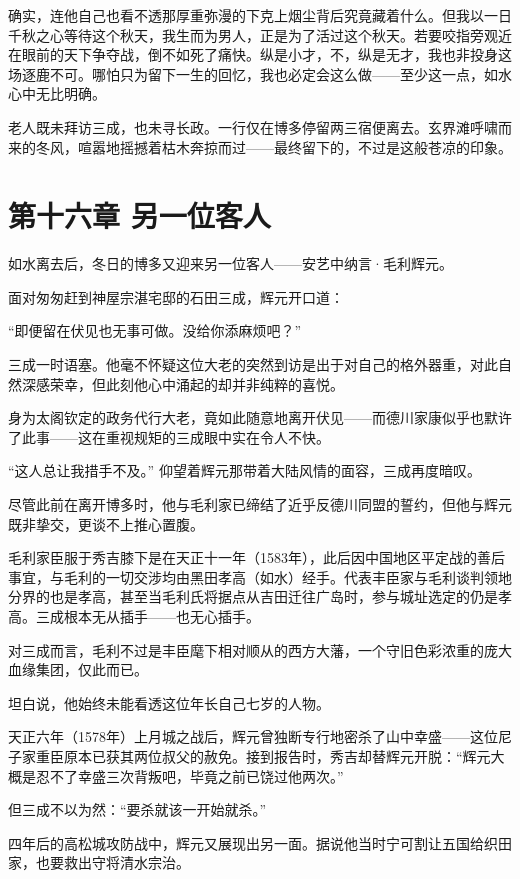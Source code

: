 \documentclass[
]{article}
\begin{document}
确实，连他自己也看不透那厚重弥漫的下克上烟尘背后究竟藏着什么。但我以一日千秋之心等待这个秋天，我生而为男人，正是为了活过这个秋天。若要咬指旁观近在眼前的天下争夺战，倒不如死了痛快。纵是小才，不，纵是无才，我也非投身这场逐鹿不可。哪怕只为留下一生的回忆，我也必定会这么做------至少这一点，如水心中无比明确。

老人既未拜访三成，也未寻长政。一行仅在博多停留两三宿便离去。玄界滩呼啸而来的冬风，喧嚣地摇撼着枯木奔掠而过------最终留下的，不过是这般苍凉的印象。

\section*{第十六章 另一位客人}\label{ux7b2cux5341ux516dux7ae0-ux53e6ux4e00ux4f4dux5ba2ux4eba}

如水离去后，冬日的博多又迎来另一位客人------安艺中纳言·毛利辉元。

面对匆匆赶到神屋宗湛宅邸的石田三成，辉元开口道：

``即便留在伏见也无事可做。没给你添麻烦吧？''

三成一时语塞。他毫不怀疑这位大老的突然到访是出于对自己的格外器重，对此自然深感荣幸，但此刻他心中涌起的却并非纯粹的喜悦。

身为太阁钦定的政务代行大老，竟如此随意地离开伏见------而德川家康似乎也默许了此事------这在重视规矩的三成眼中实在令人不快。

``这人总让我措手不及。'' 仰望着辉元那带着大陆风情的面容，三成再度暗叹。

尽管此前在离开博多时，他与毛利家已缔结了近乎反德川同盟的誓约，但他与辉元既非挚交，更谈不上推心置腹。

毛利家臣服于秀吉膝下是在天正十一年（1583年），此后因中国地区平定战的善后事宜，与毛利的一切交涉均由黑田孝高（如水）经手。代表丰臣家与毛利谈判领地分界的也是孝高，甚至当毛利氏将据点从吉田迁往广岛时，参与城址选定的仍是孝高。三成根本无从插手------也无心插手。

对三成而言，毛利不过是丰臣麾下相对顺从的西方大藩，一个守旧色彩浓重的庞大血缘集团，仅此而已。

坦白说，他始终未能看透这位年长自己七岁的人物。

天正六年（1578年）上月城之战后，辉元曾独断专行地密杀了山中幸盛------这位尼子家重臣原本已获其两位叔父的赦免。接到报告时，秀吉却替辉元开脱：``辉元大概是忍不了幸盛三次背叛吧，毕竟之前已饶过他两次。''

但三成不以为然：``要杀就该一开始就杀。''

四年后的高松城攻防战中，辉元又展现出另一面。据说他当时宁可割让五国给织田家，也要救出守将清水宗治。
\end{document}
